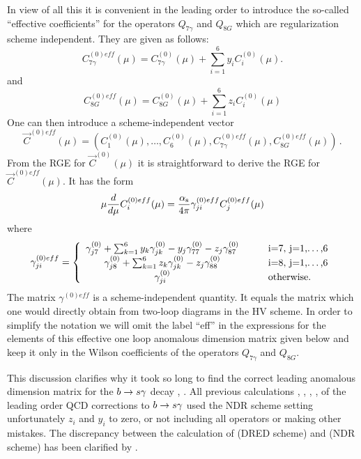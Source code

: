 In view of all this  it is convenient in the leading order to introduce
the so-called ``effective coefficients'' \cite{BMMP:94} for the
operators $Q_{7\gamma}$ and $Q_{8G}$ which are regularization scheme
independent. They are given as follows:
\begin{equation} \label{eq:defc7eff}
C^{(0)eff}_{7\gamma}(\mu) =
C^{(0)}_{7\gamma}(\mu) + \sum_{i=1}^6 y_i C^{(0)}_i(\mu).
\end{equation}
and 
\begin{equation}
C^{(0)eff}_{8G}(\mu) = C^{(0)}_{8G}(\mu) + \sum_{i=1}^6 z_i C^{(0)}_i(\mu)
\end{equation}
One can then introduce a scheme-independent vector
\begin{equation} 
\vec{C}^{(0)eff}(\mu) = \left( C^{(0)}_1(\mu),\ldots, C^{(0)}_6(\mu), 
C^{(0)eff}_{7\gamma}(\mu),C^{(0)eff}_{8G}(\mu) \right) \, .
\end{equation}
From the RGE for $\vec{C}^{(0)}(\mu)$ it is straightforward
to derive the RGE for $\vec{C}^{(0)eff}(\mu)$. It has the form
\begin{equation} \label{RGEeff}
\mu \frac{d}{d \mu} C^{(0)eff}_i(\mu) = 
\frac{\alpha_{\rm s}}{4\pi} \gamma^{(0)eff}_{ji} C^{(0)eff}_j(\mu)
\end{equation}
where
\begin{equation} \label{def.geff}
\gamma^{(0)eff}_{ji} = \left\{ \begin{array}{ccl}
\gamma^{(0)}_{j7} +
\sum_{k=1}^6 y_k\gamma^{(0)}_{jk} -y_j\gamma^{(0)}_{77} -z_j\gamma^{(0)}_{87}
&\quad& $i=7$,\ $j=1,\ldots,6$ \\
\gamma^{(0)}_{j8} +
\sum_{k=1}^6 z_k\gamma^{(0)}_{jk} -z_j\gamma^{(0)}_{88}
&\quad& $i=8$,\ $j=1,\ldots,6$ \\
\gamma^{(0)}_{ji} &\quad& \mbox{otherwise.}
\end{array}
\right.
\end{equation}
The matrix $\gamma^{(0)eff}$ is a scheme-independent quantity.
It equals the matrix which one would directly obtain from two-loop
diagrams in the HV scheme.  In order to simplify the notation we will
omit the label ``eff'' in the expressions for the elements of this
effective one loop anomalous dimension matrix given below and keep it
only in the Wilson coefficients of the operators $Q_{7\gamma}$ and
$Q_{8G}$.

This discussion clarifies why it took so long to find the correct
leading anomalous dimension matrix for the $b \to s \gamma$ decay
\cite{CFMRS:93}, \cite{CFRS:94}. All previous calculations \cite{Grin},
\cite{cella:90a}, \cite{misiak:93}, \cite{Yao1}, \cite{Yao2} of the
leading order QCD corrections to $b \to s \gamma$ used the NDR scheme setting
unfortunately $z_i$ and $y_i$ to zero, or not including all operators
or making other mistakes.
The discrepancy between the calculation of \cite{grigjanis:88} (DRED
scheme) and \cite{Grin} (NDR scheme) has been clarified by
\cite{misiak:94b}.

